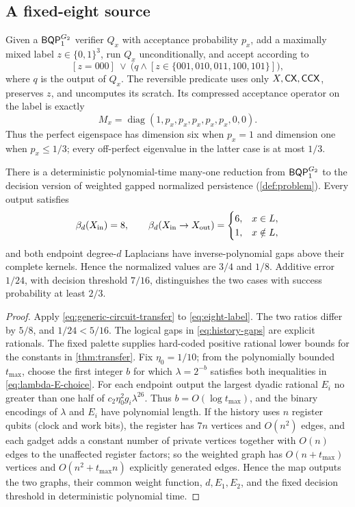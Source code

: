 \subsection{A fixed-eight source}

Given a \(\mathsf{BQP}_{1}^{G_2}\) verifier \(Q_x\) with acceptance probability \(p_x\),
add a maximally mixed label \(z\in\{0,1\}^3\), run \(Q_x\) unconditionally,
and accept according to
\[
[z=000]\ \lor\
\bigl(q\land[z\in\{001,010,011,100,101\}]\bigr),
\]
where \(q\) is the output of \(Q_x\).  The reversible predicate uses only
\(X,\mathsf{CX},\mathsf{CCX}\), preserves \(z\), and uncomputes its scratch.  Its compressed
acceptance operator on the label is exactly
\begin{equation}
\label{eq:eight-label}
M_x=\operatorname{diag}(1,p_x,p_x,p_x,p_x,p_x,0,0).
\end{equation}
Thus the perfect eigenspace has dimension six when \(p_x=1\) and dimension
one when \(p_x\le1/3\); every off-perfect eigenvalue in the latter case is at
most \(1/3\).

\begin{theorem}
\label{thm:weighted-hardness}
There is a deterministic polynomial-time many-one reduction from
\(\mathsf{BQP}_{1}^{G_2}\) to the decision version of weighted gapped normalized
persistence (\cref{def:problem}).  Every output
satisfies
\[
\beta_d(X_{\mathrm{in}})=8,\qquad
\beta_d(X_{\mathrm{in}}\to X_{\mathrm{out}})=
\begin{cases}6,&x\in L,\\1,&x\notin L,\end{cases}
\]
and both endpoint degree-\(d\) Laplacians have inverse-polynomial gaps above
their complete kernels.  Hence the normalized values are \(3/4\) and \(1/8\).
Additive error \(1/24\), with decision threshold \(7/16\), distinguishes the
two cases with success probability at least \(2/3\).
\end{theorem}

\begin{proof}
Apply \cref{eq:generic-circuit-transfer} to \cref{eq:eight-label}.  The two
ratios differ by \(5/8\), and \(1/24<5/16\).  The logical gaps in
\cref{eq:history-gaps} are explicit rationals.  The fixed palette supplies
hard-coded positive rational lower bounds for the constants in
\cref{thm:transfer}.  Fix \(\eta_0=1/10\); from the polynomially bounded
\(t_{\max}\), choose the first integer \(b\) for which
\(\lambda=2^{-b}\) satisfies both inequalities in
\cref{eq:lambda-E-choice}.  For each endpoint output the largest dyadic
rational \(E_i\) no greater than one half of
\(c_2\eta_0^2g_i\lambda^{26}\).  Thus \(b=O(\log t_{\max})\), and the binary
encodings of \(\lambda\) and \(E_i\) have polynomial length.  If the history
uses \(n\) register qubits (clock and work bits), the register has \(7n\)
vertices and \(O(n^2)\) edges, and each gadget adds a constant number of
private vertices together with \(O(n)\) edges to the unaffected register
factors; so the weighted graph has \(O(n+t_{\max})\) vertices and
\(O(n^2+t_{\max}n)\) explicitly generated edges.  Hence the map
outputs the two graphs, their common weight function, \(d,E_1,E_2\), and the
fixed decision threshold in deterministic polynomial time.
\end{proof}

